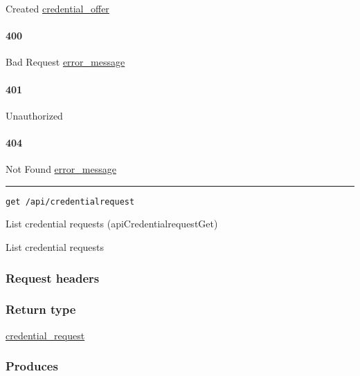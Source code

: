 Created \protect\hyperlink{credential_offer}{credential\_offer}

\hypertarget{section-223}{%
\paragraph{400}\label{section-223}}

Bad Request \protect\hyperlink{error_message}{error\_message}

\hypertarget{section-224}{%
\paragraph{401}\label{section-224}}

Unauthorized \protect\hyperlink{}{}

\hypertarget{section-225}{%
\paragraph{404}\label{section-225}}

Not Found \protect\hyperlink{error_message}{error\_message}

\begin{center}\rule{0.5\linewidth}{\linethickness}\end{center}

\protect\hypertarget{apiCredentialrequestGet}{}{}

\begin{verbatim}
get /api/credentialrequest
\end{verbatim}

List credential requests ({apiCredentialrequestGet})

List credential requests

\hypertarget{request-headers-38}{%
\subsubsection{Request headers}\label{request-headers-38}}

\hypertarget{return-type-55}{%
\subsubsection{Return type}\label{return-type-55}}

\protect\hyperlink{credential_request}{credential\_request}

\hypertarget{produces-68}{%
\subsubsection{Produces}\label{produces-68}}

